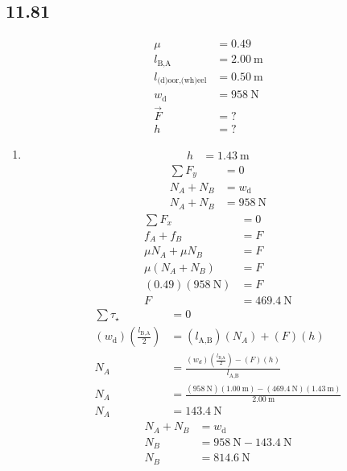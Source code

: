 \documentclass{article}
\begin{document}
\subsection{11.81}
\begin{align*}
	\mu & = 0.49 \\
	l_\text{B,A} & = \SI{2.00}{\meter} \\
	l_\text{(d)oor,(wh)eel} & = \SI{0.50}{\meter} \\
	w_\text{d} & = \SI{958}{\newton} \\
	\vec{F} & = ? \\
	h & = ?
\end{align*}
\begin{enumerate}[label=\textbf{(\alph*)}]
	\item
		\begin{align*}
			h & = \SI{1.43}{\meter}
		\end{align*}
		\begin{align*}
			\sum F_y & = 0 \\
			N_A + N_B & = w_\text{d} \\
			N_A + N_B & = \SI{958}{\newton}
		\end{align*}
		\begin{align*}
			\sum F_x & = 0 \\
			f_A + f_B & = F \\
			\mu N_A + \mu N_B & = F \\
			\mu(N_A + N_B) & = F \\
			(0.49)(\SI{958}{\newton}) & = F \\
			F & = \SI{469.4}{\newton}
		\end{align*}
		\begin{align*}
			\sum \tau_\star & = 0 \\
			(w_\text{d}) \left( \frac{l_\text{B,A}}{2} \right) & = (l_\text{A,B})(N_A) + (F)(h) \\
			N_A & = \frac{(w_d)\left(\frac{l_\text{B,A}}{2}\right)-(F)(h)}{l_\text{A,B}} \\
			N_A & = \frac{(\SI{958}{\newton})(\SI{1.00}{\meter}) - (\SI{469.4}{\newton})(\SI{1.43}{\meter})}{\SI{2.00}{\meter}} \\
			N_A & = \SI{143.4}{\newton}
		\end{align*}
		\begin{align*}
			N_A + N_B & = w_\text{d} \\
			N_B & = \SI{958}{\newton} - \SI{143.4}{\newton} \\
			N_B & = \SI{814.6}{\newton}
		\end{align*}

\end{enumerate}
\end{document}
